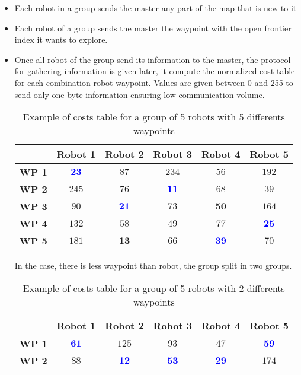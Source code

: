 \documentclass[../main.tex]{subfiles}
\begin{document}
\begin{itemize}
	\item Each robot in a group sends the master any part of the map that is new to it
	\item Each robot of a group sends the master the waypoint with the open frontier index it wants to explore.
	\item Once all robot of the group send its information to the master, the protocol for gathering information is given later, it compute the normalized cost table for each combination robot-waypoint. Values are given between 0 and 255 to send only one byte information ensuring low communication volume. 
	
	\begin{table}[H]
		\centering
		\begin{tabular}{|c|c|c|c|c|c|}
			\hline
			& \textbf{Robot 1} & \textbf{Robot 2} & \textbf{Robot 3} & \textbf{Robot 4} & \textbf{Robot 5}\\
			\hline
			\textbf{WP 1} & \textcolor{blue}{$\mathbf{23}$} & $87$ & $234$ & $56$ & $192$ \\
			\hline
			\textbf{WP 2} & $245$ & $76$ & \textcolor{blue}{$\mathbf{11}$} & $68$ & $39$ \\
			\hline
			\textbf{WP 3} & $90$ & \textcolor{blue}{$\mathbf{21}$} & $73$ & $\mathbf{50}$ & $164$ \\
			\hline
			\textbf{WP 4} & $132$ & $58$ & $49$ & $77$ & \textcolor{blue}{$\mathbf{25}$} \\
			\hline
			\textbf{WP 5} & $181$ & $\mathbf{13}$ & $66$ & \textcolor{blue}{$\mathbf{39}$} & $70$ \\ 
			\hline
	
		\end{tabular}
		\caption{Example of costs table for a group of 5 robots with 5 differents waypoints}
		\label{tab:example_5R5WP}
	\end{table}
	
	In the case, there is less waypoint than robot, the group split in two groups.
	
	\begin{table}[H]
		\centering
		\begin{tabular}{|c|c|c|c|c|c|}
			\hline
			& \textbf{Robot 1} & \textbf{Robot 2} & \textbf{Robot 3} & \textbf{Robot 4} & \textbf{Robot 5}\\
			\hline
			\textbf{WP 1} & \textcolor{blue}{$\mathbf{61}$} & $125$ & $93$ & $47$ & \textcolor{blue}{$\mathbf{59}$} \\
			\hline
			\textbf{WP 2} & $88$ & \textcolor{blue}{$\mathbf{12}$} & \textcolor{blue}{$\mathbf{53}$} & \textcolor{blue}{$\mathbf{29}$} & $174$ \\ 
			\hline
		\end{tabular}
		\caption{Example of costs table for a group of 5 robots with 2 differents waypoints}
		\label{tab:example_5R2WP}
	\end{table}



\end{itemize}
\end{document}

